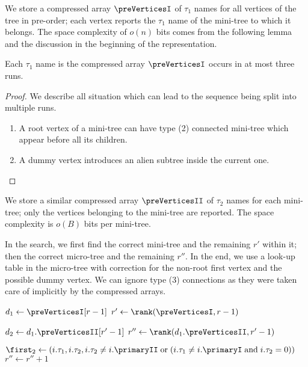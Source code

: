 We store a compressed array $\preVerticesI$ of $\tau_1$ names for all vertices of the tree in pre-order; each vertex reports the $\tau_1$ name of the mini-tree to which it belongs.
The space complexity of $o(n)$ bits comes from the following lemma and the discussion in the beginning of the representation.

\begin{lemma}
	Each $\tau_1$ name is the compressed array $\preVerticesI$ occurs in at most three runs.
\end{lemma}
\begin{proof}
	We describe all situation which can lead to the sequence being split into multiple runs.
	\begin{enumerate}
		\item A root vertex of a mini-tree can have type (2) connected mini-tree which appear before all its children.
		\item A dummy vertex introduces an alien subtree inside the current one.
	\end{enumerate}
\end{proof}

We store a similar compressed array $\preVerticesII$ of $\tau_2$ names for each mini-tree; only the vertices belonging to the mini-tree are reported.
The space complexity is $o(B)$ bits per mini-tree.

In the search, we first find the correct mini-tree and the remaining $r'$ within it; then the correct micro-tree and the remaining $r''$.
In the end, we use a look-up table in the micro-tree with correction for the non-root first vertex and the possible dummy vertex.
We can ignore type (3) connections as they were taken care of implicitly by the compressed arrays.

\begin{algorithm}
\begin{algorithmic}
	\State $d_1 \gets \preVerticesI[r - 1]$ 
	\State $r' \gets \rank(\preVerticesI, r - 1)$

	\State $d_2 \gets d_1.\preVerticesII[r' - 1]$ 
	\State $r'' \gets \rank(d_1.\preVerticesII, r' - 1)$
	
	\Statex
	
	\State $\first_2 \gets (i.\tau_1, i.\tau_2, i.\tau_2 \ne i.\primaryII \boolor (i.\tau_1 \ne i.\primaryI \booland i.\tau_2 = 0))$
		\State $r'' \gets r'' + 1$ 
	\EndIf
	
	\State {}
\EndFunction
\end{algorithmic}
\end{algorithm}

